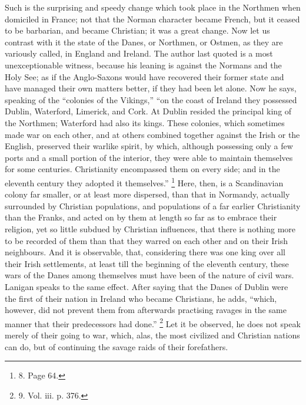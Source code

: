 Such is the surprising and
speedy change which took place in the Northmen when domiciled in
France; not that the Norman character became French, but it ceased to
be barbarian, and became Christian; it was a great change. Now let us
contrast with it the state of the Danes, or Northmen, or Ostmen, as
they are variously called, in England and Ireland. The author last
quoted is a most unexceptionable witness, because his leaning is
against the Normans and the Holy See; as if the Anglo-Saxons would
have recovered their former state and have managed their own matters
better, if they had been let alone. Now he says, speaking of the ``colonies
of the Vikings,'' ``on the coast of Ireland they possessed Dublin,
Waterford, Limerick, and Cork. At Dublin resided the principal king of
the Northmen; Waterford had also its kings. These colonies, which
sometimes made war on each other, and at others combined together
against the Irish or the English, preserved their warlike spirit, by
which, although possessing only a few ports and a small portion of the
interior, they were able to maintain themselves for some centuries.
Christianity encompassed them on every side; and in the eleventh
century they adopted it themselves.'' \footnote{8.
Page 64.} Here, then, is a Scandinavian colony far smaller, or at least
more dispersed, than that in Normandy, actually surrounded by
Christian populations, and populations of a far earlier Christianity
than the Franks, and acted on by them at length so far as to embrace
their religion, yet so little subdued by Christian influences, that
there is nothing more to be recorded of them than that they warred on
each other and on their Irish neighbours. And it is observable, that,
considering there was one king over all their Irish settlements, at
least till the beginning of the eleventh century, these wars of the
Danes among themselves must have been of the nature of civil
wars. Lanigan speaks to the same effect. After saying that the Danes
of Dublin were the first of their nation in Ireland who became
Christians, he adds, ``which, however, did not prevent them from
afterwards practising ravages in the same manner that their
predecessors had done.'' \footnote{9.
Vol. iii. p. 376.}
Let it be observed, he does not speak merely of their going to war,
which, alas, the most civilized and Christian nations can do, but of
continuing the savage raids of their forefathers.

